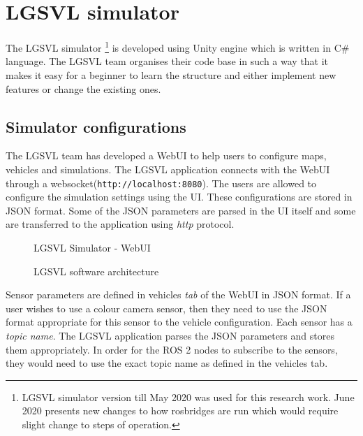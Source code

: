\section{LGSVL simulator}
The LGSVL simulator \footnote{LGSVL simulator version till May 2020 was used for this
    research work. June 2020 presents new changes to how rosbridges are run which would require slight
change to steps of operation.} is developed using Unity engine which is written in C\# language.
The LGSVL team organises their code base\cite{lgsvlgithub} in such a way that it makes it
easy for a beginner to learn the structure and either implement new features or change the
existing ones.

\subsection{Simulator configurations}
The LGSVL team has developed a WebUI to help users to configure maps, vehicles and
simulations. The LGSVL application connects with the WebUI through a
websocket(\texttt{http://localhost:8080}). The users are allowed to configure the
simulation settings using the UI. These configurations are stored in JSON format. Some of the JSON parameters
are parsed in the UI itself and some are transferred to the application using
\textit{http} protocol.

\begin{wrapfigure}{l}{0.4\textwidth}
	\centering
    \def\svgwidth{0.4\textwidth}
    \caption{LGSVL Simulator - WebUI}
    \label{fig:lgsvlwebui}
    \vspace{-15pt}
\end{wrapfigure}

\begin{figure}[!ht]
	\centering
    \def\svgwidth{0.6\textwidth}
    \caption{LGSVL software architecture}
    \label{fig:lgsvlswarchitecture}
\end{figure}
Sensor parameters are defined in vehicles \textit{tab} of the WebUI in JSON format. If a user wishes to use a colour camera
sensor, then they need to use the JSON format appropriate for this sensor to the vehicle
configuration. Each sensor has a \textit{topic name}. The LGSVL application parses the JSON
parameters and stores them appropriately. In order for the ROS 2 nodes to subscribe to the
sensors, they would need to use the exact topic name as defined in the vehicles tab.

